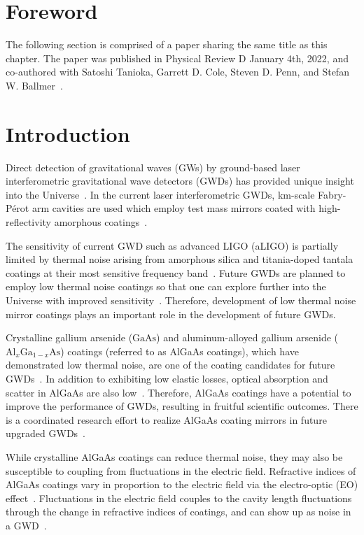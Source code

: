 \section{Foreword}
The following section is comprised of a paper sharing the same title as this chapter. The paper was published in Physical Review D January 4th, 2022, and co-authored with Satoshi Tanioka, Garrett D. Cole, Steven D. Penn, and Stefan W. Ballmer~\cite{tanioka:2022}.

\section{Introduction}
Direct detection of gravitational waves (GWs) by ground-based laser interferometric gravitational wave detectors (GWDs) has provided unique insight into the Universe~\cite{Abbott2016, gw170817, Abbott2021}.
In the current laser interferometric GWDs, km-scale Fabry-P\'erot arm cavities are used which employ test mass mirrors coated with high-reflectivity amorphous coatings~\cite{Degallaix2019, Granata2020}.

The sensitivity of current GWD such as advanced LIGO (aLIGO) is partially limited by thermal noise arising from amorphous silica and titania-doped tantala coatings at their most sensitive frequency band~\cite{harry:2006, Gras2018}.
Future GWDs are planned to employ low thermal noise coatings so that one can explore further into the Universe with improved sensitivity~\cite{Punturo_2010, Adhikari2020, CEHS, Srivastava2022}.
Therefore, development of low thermal noise mirror coatings plays an important role in the development of future GWDs.

Crystalline gallium arsenide ($\mathrm{GaAs}$) and aluminum-alloyed gallium arsenide ($\mathrm{Al}_{x}\mathrm{Ga}_{1-x}\mathrm{As}$) coatings (referred to as AlGaAs coatings), which have demonstrated low thermal noise, are one of the coating candidates for future GWDs~\cite{cole:2013, Penn2019}.
In addition to exhibiting low elastic losses, optical absorption and scatter in AlGaAs are also low~\cite{cole:2016, Winkler2021}.
Therefore, AlGaAs coatings have a potential to improve the performance of GWDs, resulting in fruitful scientific outcomes.
There is a coordinated research effort to realize AlGaAs coating mirrors in future upgraded GWDs~\cite{Chalermsongsak2016, Marchio2018, Koch2019}.

While crystalline AlGaAs coatings can reduce thermal noise, they may also be susceptible to coupling from fluctuations in the electric field.
Refractive indices of AlGaAs coatings vary in proportion to the electric field via the electro-optic (EO) effect~\cite{Namba1961, yariv}.
Fluctuations in the electric field couples to the cavity length fluctuations through the change in refractive indices of coatings, and can show up as noise in a GWD~\cite{Abernathy, bonillafejer}.

